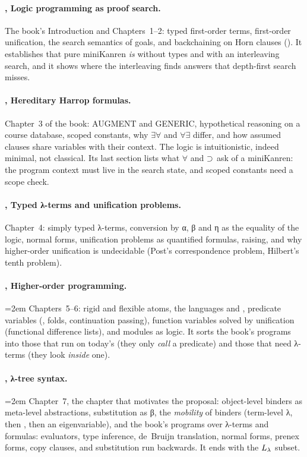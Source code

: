 \paragraph{, Logic programming as proof search.} The book's Introduction and Chapters~1--2:
typed first-order terms, first-order unification, the search semantics of goals, and backchaining on Horn
clauses (\fohc). It establishes that pure miniKanren \emph{is} \fohc{} without types and with an interleaving
search, and it shows where the interleaving finds answers that depth-first search misses.

\paragraph{, Hereditary Harrop formulas.} Chapter~3 of the book: AUGMENT and GENERIC, hypothetical
reasoning on a course database, scoped constants, why $\exists\forall$ and $\forall\exists$
differ, and how assumed clauses share variables with their context. The logic is intuitionistic, indeed
minimal, not classical. Its last section lists what $\forall$ and $\supset$ ask of a miniKanren: the program
context must live in the search state, and scoped constants need a scope check.

\paragraph{, Typed λ-terms and unification problems.} Chapter~4: simply typed λ-terms,
conversion by α, β and η as the equality of the logic, normal forms, unification problems as quantified formulas,
raising, and why higher-order unification is undecidable (Post's correspondence problem, Hilbert's tenth
problem).

\paragraph{, Higher-order programming.} {\emergencystretch=2em Chapters~5--6: rigid and flexible atoms, the
languages \hohc{} and \hohh{}, predicate variables (, folds, continuation passing),
function variables solved by unification (functional difference lists), and modules as logic. It sorts
the book's programs into those that run on today's \micro{} (they only \emph{call} a predicate) and those
that need λ-terms (they look \emph{inside} one).\par}

\paragraph{, λ-tree syntax.} {\emergencystretch=2em Chapter~7, the chapter that motivates the proposal:
object-level binders as meta-level abstractions, substitution as β, the \emph{mobility} of binders
(term-level λ, then , then an eigenvariable), and the book's programs over λ-terms and formulas:
evaluators, type inference, de~Bruijn translation, normal forms, prenex forms, copy clauses, and
substitution run backwards. It ends with the $L_\lambda$ subset.\par}

